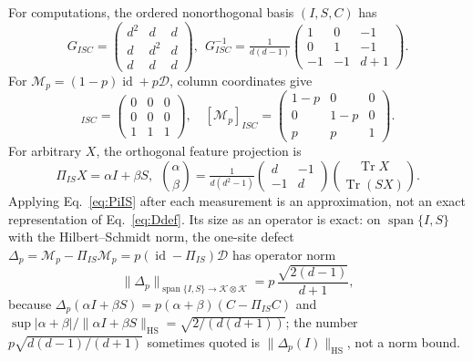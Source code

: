 \documentclass[aps,prx,reprint,superscriptaddress,nobibnotes,longbibliography]{revtex4-2}
\theoremstyle{remark}
\newcommand{\id}{\operatorname{id}}
\newcommand{\Tr}{\operatorname{Tr}}
\newcommand{\HS}{\mathrm{HS}}
\newcommand{\cK}{\mathcal K}
\begin{document}
For computations, the ordered nonorthogonal basis $(I,S,C)$ has
\begin{equation}
 G_{ISC}=\begin{pmatrix}d^2&d&d\\d&d^2&d\\d&d&d\end{pmatrix}\!,\ \ 
 G_{ISC}^{-1}=\tfrac{1}{d(d-1)}\!
 \begin{pmatrix}1&0&-1\\0&1&-1\\-1&-1&d{+}1\end{pmatrix}\!.
 \label{eq:GISC}
\end{equation}
For $\mathcal M_p=(1-p)\id+p\mathcal D$, column coordinates give
\begin{equation}
 [\mathcal D]_{ISC}=\begin{pmatrix}0&0&0\\0&0&0\\1&1&1\end{pmatrix},\quad
 [\mathcal M_p]_{ISC}=\begin{pmatrix}1{-}p&0&0\\0&1{-}p&0\\p&p&1\end{pmatrix}\!.
 \label{eq:MpISC}
\end{equation}
For arbitrary $X$, the orthogonal feature projection is
\begin{equation}
 \Pi_{IS}X=\alpha I+\beta S,\ \ 
 \binom\alpha\beta=\tfrac{1}{d(d^2-1)}\!
 \begin{pmatrix}d&-1\\-1&d\end{pmatrix}\!
 \binom{\Tr X}{\Tr(SX)}\!.
 \label{eq:PiIS}
\end{equation}
Applying Eq.~\eqref{eq:PiIS} after each measurement is an approximation, not an exact representation of Eq.~\eqref{eq:Ddef}.  Its size as an operator is exact: on $\operatorname{span}\{I,S\}$ with the Hilbert--Schmidt norm, the one-site defect $\Delta_p=\mathcal M_p-\Pi_{IS}\mathcal M_p=p(\id-\Pi_{IS})\mathcal D$ has operator norm
\begin{equation}
 \|\Delta_p\|_{\operatorname{span}\{I,S\}\to\cK\otimes\cK}=p\,\frac{\sqrt{2(d-1)}}{d+1},
 \label{eq:defectnorm}
\end{equation}
because $\Delta_p(\alpha I+\beta S)=p(\alpha+\beta)(C-\Pi_{IS}C)$ and $\sup|\alpha+\beta|/\|\alpha I+\beta S\|_{\HS}=\sqrt{2/(d(d+1))}$; the number $p\sqrt{d(d-1)/(d+1)}$ sometimes quoted is $\|\Delta_p(I)\|_{\HS}$, not a norm bound.
\end{document}
